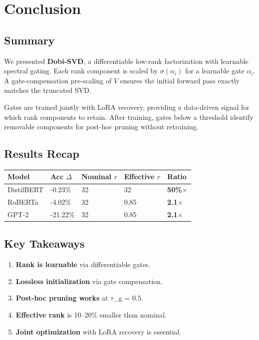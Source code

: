 
\section{Conclusion}

\subsection{Summary}

We presented \textbf{Dobi-SVD}, a differentiable low-rank factorization with 
learnable spectral gating. Each rank component is scaled by $\sigma(\alpha_i)$ 
for a learnable gate $\alpha_i$. A gate-compensation pre-scaling of $V$ 
ensures the initial forward pass exactly matches the truncated SVD.

Gates are trained jointly with LoRA recovery, providing a data-driven 
signal for which rank components to retain. After training, gates below 
a threshold identify removable components for post-hoc pruning without 
retraining.

\subsection{Results Recap}

\begin{table}[H]
\centering
\small
\begin{tabular}{lllll}
\toprule
\textbf{Model} & \textbf{Acc $\Delta$} & \textbf{Nominal $r$} & \textbf{Effective $r$} & \textbf{Ratio} \\
\midrule
DistilBERT & -0.23\% & 32 & 32 & \textbf{50\%$\times$} \\
RoBERTa & -4.02\% & 32 & 0.85 & \textbf{2.1$\times$} \\
GPT-2 & -21.22\% & 32 & 0.85 & \textbf{2.1$\times$} \\
\bottomrule
\end{tabular}
\end{table}

\subsection{Key Takeaways}

\begin{enumerate}
\item \textbf{Rank is learnable} via differentiable gates.
\item \textbf{Lossless initialization} via gate compensation.
\item \textbf{Post-hoc pruning works} at $\tau$\_g = 0.5.
\item \textbf{Effective rank} is 10--20\% smaller than nominal.
\item \textbf{Joint optimization} with LoRA recovery is essential.

\end{enumerate}
